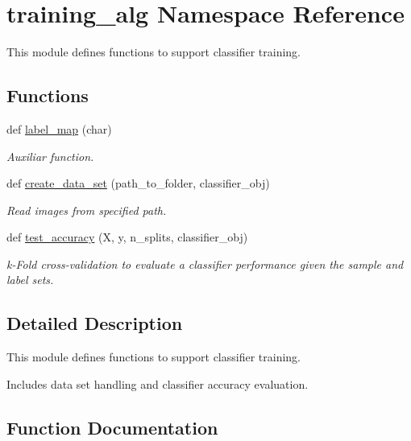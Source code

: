 \hypertarget{namespacetraining__alg}{}\section{training\+\_\+alg Namespace Reference}
\label{namespacetraining__alg}


This module defines functions to support classifier training.  


\subsection*{Functions}
\begin{DoxyCompactItemize}
\item 
def \mbox{\hyperlink{namespacetraining__alg_a1b1bb425cd94ca0358c835ae1968470b}{label\+\_\+map}} (char)
\begin{DoxyCompactList}\small\item\em Auxiliar function. \end{DoxyCompactList}\item 
def \mbox{\hyperlink{namespacetraining__alg_ab0dcf58728275d92e36a03d7ec3189b1}{create\+\_\+data\+\_\+set}} (path\+\_\+to\+\_\+folder, classifier\+\_\+obj)
\begin{DoxyCompactList}\small\item\em Read images from specified path. \end{DoxyCompactList}\item 
def \mbox{\hyperlink{namespacetraining__alg_aab0eb2ef6247a13da63fd3717fbf7739}{test\+\_\+accuracy}} (X, y, n\+\_\+splits, classifier\+\_\+obj)
\begin{DoxyCompactList}\small\item\em k-\/\+Fold cross-\/validation to evaluate a classifier performance given the sample and label sets. \end{DoxyCompactList}\end{DoxyCompactItemize}


\subsection{Detailed Description}
This module defines functions to support classifier training. 

Includes data set handling and classifier accuracy evaluation. 

\subsection{Function Documentation}
\mbox{\label{namespacetraining__alg_ab0dcf58728275d92e36a03d7ec3189b1}} 
